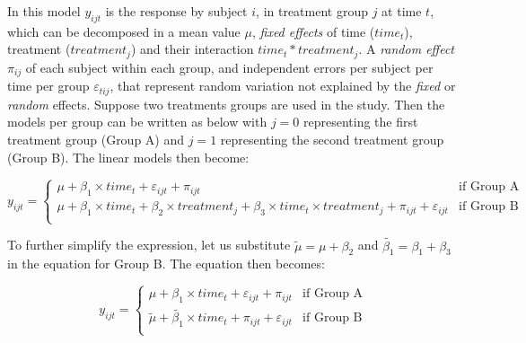 \documentclass[
]{article}
\begin{document}
In this model \(y_{ijt}\) is the response by subject \(i\), in treatment group \(j\) at time \(t\), which can be decomposed in a mean value \(\mu\), \emph{fixed effects} of time (\(time_t\)), treatment (\(treatment_j\)) and their interaction \(time_t*treatment_j\). A \emph{random effect} \(\pi_{ij}\) of each subject within each group, and independent errors per subject per time per group \(\varepsilon_{tij}\), that represent random variation not explained by the \emph{fixed} or \emph{random} effects.
Suppose two treatments groups are used in the study. Then the models per group can be written as below with \(j=0\) representing the first treatment group (Group A) and \(j=1\) representing the second treatment group (Group B). The linear models then become:

\begin{equation}
y_{ijt} = \begin{cases}
\mu + \beta_1\times time_{t}+\varepsilon_{ijt}+\pi_{ijt}   & \mbox{if Group A}\\
\mu + \beta_1 \times time_{t} + \beta_2 \times treatment_{j} +\beta_3 \times time_{t} \times treatment_{j}+\pi_{ijt}+\varepsilon_{ijt}  & \mbox{if Group B}\\
\end{cases}
\label{eq:ANOVA-by-group}
\end{equation}

To further simplify the expression, let us substitute \(\widetilde{\mu}=\mu+\beta_{2}\) and \(\widetilde{\beta_{1}}=\beta_{1}+\beta_{3}\) in the equation for Group B. The equation then becomes:

\begin{equation}
y_{ijt} = \begin{cases}
\mu + \beta_1\times time_{t}+\varepsilon_{ijt}+\pi_{ijt}   & \mbox{if Group A}\\
\widetilde{\mu} + \widetilde{\beta_1} \times time_{t} +\pi_{ijt}+\varepsilon_{ijt}  & \mbox{if Group B}\\
\end{cases}
\label{eq:ANOVA-lines}
\end{equation}
\end{document}
